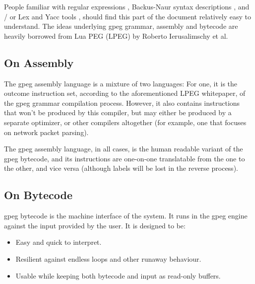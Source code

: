 People familiar with regular expressions \cite{bib:regex},
Backus-Naur syntax descriptions \cite{bib:backusnaur},
and / or Lex and Yacc tools \cite{bib:yacc},
should find this part of the document relatively easy to understand.
The ideas underlying gpeg grammar, assembly and bytecode
are heavily borrowed from Lua PEG (LPEG) \cite{bib:peg}
by Roberto Ierusalimschy et al.

\subsection{On Assembly}

The gpeg assembly language is a mixture of two languages:
For one, it is the outcome instruction set, according to the
aforementioned LPEG whitepaper,
of the gpeg grammar compilation process. However, it also contains
instructions that won't be produced by this compiler, but may
either be produced by a separate optimizer, or other compilers
altogether (for example, one that focuses on network packet
parsing).

The gpeg assembly language, in all cases, is the human readable
variant of the gpeg bytecode, and its instructions are one-on-one
translatable from the one to the other, and vice versa
(although labels will be lost in the reverse process).

\subsection{On Bytecode}

gpeg bytecode is the machine interface of the system.
It runs in the gpeg engine against the input provided by the user.
It is designed to be:

\begin{itemize}

\item Easy and quick to interpret.
\item Resilient against endless loops and other runaway behaviour.
\item Usable while keeping both bytecode and input as read-only buffers.

\end{itemize}
